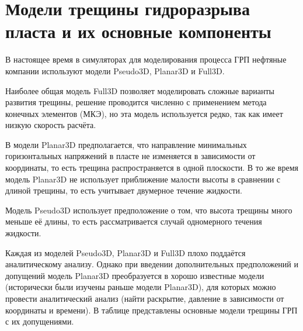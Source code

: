 \chapter{Модели трещины гидроразрыва пласта и их основные компоненты} \label{ch2}

В настоящее время в симуляторах для моделирования процесса ГРП нефтяные компании используют модели Pseudo3D, Planar3D и Full3D.

Наиболее общая модель Full3D позволяет моделировать сложные варианты развития трещины, решение проводится численно с применением метода конечных элементов (МКЭ), но эта модель используется редко, так как имеет низкую скорость расчёта.

В модели Planar3D предполагается, что направление минимальных горизонтальных напряжений в пласте не изменяется в зависимости от координаты, то есть трещина распространяется в одной плоскости.
В то же время модель Planar3D не использует приближение малости высоты в сравнении с длиной трещины, то есть учитывает двумерное течение жидкости.

Модель Pseudo3D использует предположение о том, что высота трещины много меньше её длины, то есть рассматривается случай одномерного течения жидкости.

Каждая из моделей Pseudo3D, Planar3D и Full3D плохо поддаётся аналитическому анализу.
Однако при введении дополнительных предположений и допущений модель Planar3D преобразуется в хорошо известные модели (исторически были изучены раньше модели Planar3D), для которых можно провести аналитический анализ (найти раскрытие, давление в зависимости от координаты и времени).
В таблице представлены основные модели трещины ГРП с их допущениями.

